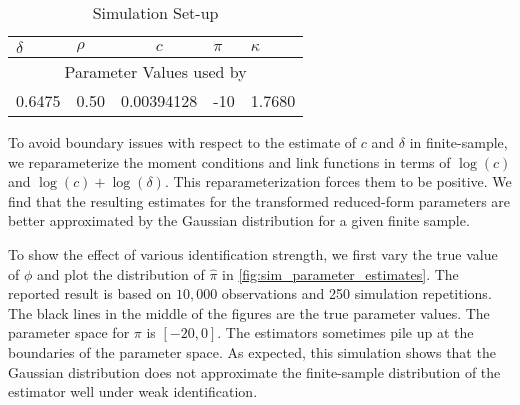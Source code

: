 \begin{table}[htb]
 
 \centering
 \caption{Simulation Set-up}
 \label{tbl:simulationParameters}
 
 \begin{tabularx}{.75\textwidth}{X X c X X}

  \toprule
  $\delta$ & $\rho$ & $c$ & $\pi$ & $\kappa$ \\
  \midrule
  \multicolumn{5}{c}{Parameter Values used by \textcite{han2018leverage}} \\
  \midrule
  0.6475  & 0.50  & \num[scientific-notation=true]{.00394128} & -10 & 1.7680 \\
  \bottomrule
%
 \end{tabularx}

\end{table}

 
To avoid boundary issues with respect to the estimate of $c$ and $\delta$ in finite-sample, we reparameterize the moment conditions and link functions in terms of $\log(c)$ and $\log(c) + \log(\delta)$. This reparameterization forces them to be positive. We find that the resulting estimates for the transformed reduced-form parameters are better approximated by the Gaussian distribution for a given finite sample. 


To show the effect of various identification strength, we first vary the true value of $\phi$ and plot the distribution of $\widehat{\pi}$ in \cref{fig:sim_parameter_estimates}. The reported result is based on $10,000$ observations and \num{250} simulation repetitions. The black lines in the middle of the figures are the true parameter values. The parameter space for $\pi$ is $[-20, 0]$. The estimators sometimes pile up at the boundaries of the parameter space. As expected, this simulation shows that the Gaussian distribution does not approximate the finite-sample distribution of the estimator well under weak identification. 


